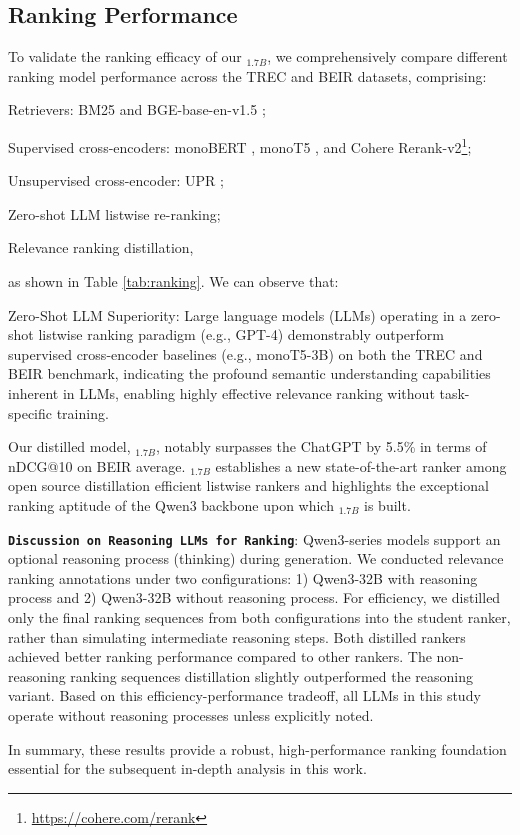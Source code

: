 \subsection{Ranking Performance}
To validate the ranking efficacy of our \rank$_{1.7B}$, we comprehensively compare different ranking model performance across the TREC and BEIR datasets, comprising:
\begin{enumerate*}
\item Retrievers: BM25  \cite{robertson2009probabilistic}  and BGE-base-en-v1.5 \cite{bge_embedding}; 
\item Supervised cross-encoders: monoBERT \cite{nogueira2019passage}, monoT5 \cite{nogueira2020document}, and Cohere Rerank-v2\footnote{\url{https://cohere.com/rerank}}; 
\item Unsupervised cross-encoder: UPR \cite{sachan2022improving}; 
\item Zero-shot LLM listwise re-ranking;  
\item Relevance ranking distillation, 
\end{enumerate*}
as shown in Table \ref{tab:ranking}.   
We can observe that:
\begin{enumerate*}[label=(\roman*)]
\item Zero-Shot LLM Superiority: Large language models (LLMs) operating in a zero-shot listwise ranking paradigm (e.g., GPT-4) demonstrably outperform supervised cross-encoder baselines (e.g., monoT5-3B) on both the TREC and BEIR benchmark, indicating the profound semantic understanding capabilities inherent in LLMs, enabling highly effective relevance ranking without task-specific training. 
\item Our distilled model, \rank$_{1.7B}$, notably surpasses the  ChatGPT by 5.5\% in terms of nDCG@10 on BEIR average. 
\rank$_{1.7B}$ establishes a new state-of-the-art ranker among open source distillation efficient listwise rankers and highlights the exceptional ranking aptitude of the Qwen3 backbone upon which \rank$_{1.7B}$ is built. 
\item \textbf{\texttt{Discussion on Reasoning LLMs for Ranking}}: 
Qwen3-series models support an optional reasoning process (thinking) during generation. We conducted relevance ranking annotations under two configurations: 1) Qwen3-32B with reasoning process and 2) Qwen3-32B without reasoning process. For efficiency, we distilled only the final ranking sequences from both configurations into the student ranker, rather than simulating intermediate reasoning steps. Both distilled rankers achieved better ranking performance compared to other rankers. The non-reasoning ranking sequences distillation slightly outperformed the reasoning variant. Based on this efficiency-performance tradeoff, all LLMs in this study operate without reasoning processes unless explicitly noted. 
\end{enumerate*} 
In summary, these results provide a robust, high-performance ranking foundation essential for the subsequent in-depth analysis in this work.  


